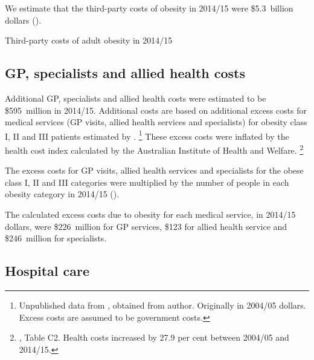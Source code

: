 \documentclass[embargoed]{grattan}
\begin{document}
We estimate that the third-party costs of obesity in 2014/15 were \$5.3~billion dollars ().

\begin{table}
\caption{Third-party costs of adult obesity in 2014/15}\label{tbl:3rd-party-costs-of-adult-obesity}



\end{table}

\subsection{GP, specialists and allied health costs}\label{gp-specialists-and-allied-health-costs}

Additional GP, specialists and allied health costs were estimated to be \$595~million in 2014/15.
Additional costs are based on additional excess costs for medical services (GP visits, allied health services and specialists) for obesity class I, II and III patients estimated by \textcite{Colagiuri2010costoverweightobesity}.%
\footnote{Unpublished data from \textcite{Colagiuri2010costoverweightobesity}, obtained from author.
Originally in 2004/05 dollars.
Excess costs are assumed to be government costs.}
These excess costs were inflated by the health cost index calculated by the Australian Institute of Health and Welfare.%
\footnote{\textcite{Health2015HealthexpenditureAustralia}, Table C2. Health costs increased by 27.9 per cent between 2004/05 and 2014/15.}

The excess costs for GP visits, allied health services and specialists for the obese class I, II and III categories were multiplied by the number of people in each obesity category in 2014/15 ().

The calculated excess costs due to obesity for each medical service, in 2014/15 dollars, were \$226~million for GP services, \$123 for allied health service and \$246~million for specialists.

\subsection{Hospital care }\label{hospital-care}
\end{document}
